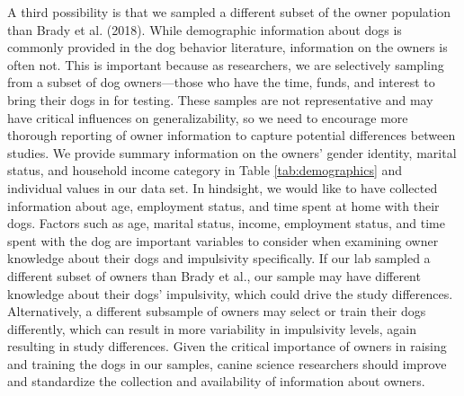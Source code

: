 \documentclass[
  pub,floatsintext]{apa6}
\begin{document}
A third possibility is that we sampled a different subset of the owner population than Brady et al. (2018). While demographic information about dogs is commonly provided in the dog behavior literature, information on the owners is often not. This is important because as researchers, we are selectively sampling from a subset of dog owners---those who have the time, funds, and interest to bring their dogs in for testing. These samples are not representative and may have critical influences on generalizability, so we need to encourage more thorough reporting of owner information to capture potential differences between studies. We provide summary information on the owners' gender identity, marital status, and household income category in Table \ref{tab:demographics} and individual values in our data set. In hindsight, we would like to have collected information about age, employment status, and time spent at home with their dogs. Factors such as age, marital status, income, employment status, and time spent with the dog are important variables to consider when examining owner knowledge about their dogs and impulsivity specifically. If our lab sampled a different subset of owners than Brady et al., our sample may have different knowledge about their dogs' impulsivity, which could drive the study differences. Alternatively, a different subsample of owners may select or train their dogs differently, which can result in more variability in impulsivity levels, again resulting in study differences. Given the critical importance of owners in raising and training the dogs in our samples, canine science researchers should improve and standardize the collection and availability of information about owners.
\end{document}
